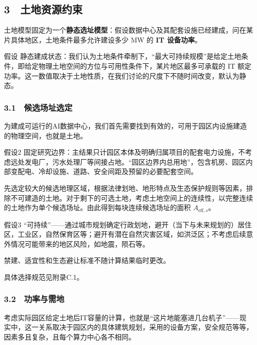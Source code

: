 \subsection{3　土地资源约束}

土地模型固定为一个\textbf{静态选址模型}：假设数据中心及其配套设施已经建成，问在某片具体地区，土地条件最多允许建设多少 MW 的 \textbf{IT 设备功率}。

\begin{asum}
假设 静态建成状态：我们认为土地条件牵制下，“最大可持续规模”是给定土地条件，即给定物理土地空间的方位与可用性条件下，某片地区最多可承载的 IT 额定功率。这一数值取决于土地性质，在我们讨论的尺度下不随时间改变，默认为静态。
\end{asum}

\subsubsection{3.1　候选场址选定}

为建成可运行的AI数据中心，我们首先需要找到有效的，可用于园区内设施建造的物理空间，也就是土地。

\begin{asum}
假设2 固定研究边界：主结果只计园区本体及明确归属项目的配套电力设施，不考虑远处发电厂，污水处理厂等间接占地。“园区边界内总用地”，包含机房、园区内部变配电、冷却设施、道路、安全间距及预留的必要配套空间。
\end{asum}

先选定较大的候选地理区域，根据法律划地、地形特点及生态保护规则等因素，排除不可建造的土地。对于剩下的可选土地，考虑土地空间上的连续性，以完整连续的土地作为单个候选场址。由此得到每块连续候选场址的面积 $A_{\mathrm{eff},s}$。

\begin{asum}
假设3 “可持续”——通过城市规划确定行政划地，避开（当下与未来规划的）居住区，工业区，自然保育区等；避开有潜在自然灾害区域，如洪泛区；不考虑后续意外情况可能带来的地区风险，如地震，陨石等。

禁建、适宜性和生态避让标准不随计算结果临时更改。
\end{asum}

具体选择规范见附录C.1。

\subsubsection{3.2　功率与需地}

考虑实际园区给定土地后IT容量的计算，也就是“这片地能塞进几台机子”——现实中，这一关系取决于园区内的具体建筑规划，采用的设备方案，安全规范等等，因素多且复杂，且每个算力中心各不相同。

